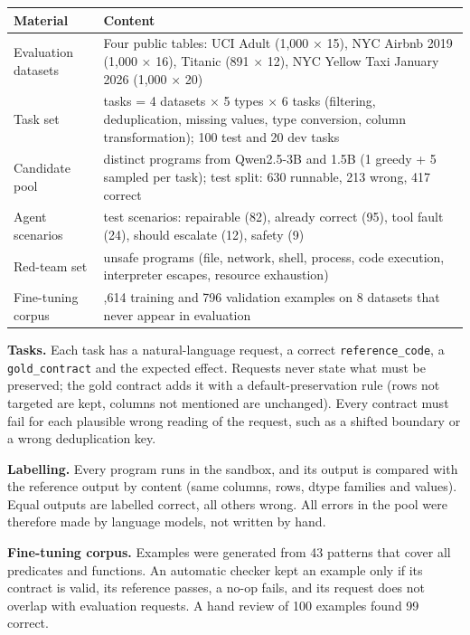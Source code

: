 \documentclass[11pt]{article}
\begin{document}
\begin{table}[!tp]
\centering\footnotesize\setlength{\tabcolsep}{3pt}\renewcommand{\arraystretch}{1.1}
\begin{tabularx}{\textwidth}{l>{\raggedright\arraybackslash}X}
\toprule
\textbf{Material} & \textbf{Content} \\
\midrule
Evaluation datasets & Four public tables: UCI Adult (1,000 × 15), NYC Airbnb 2019 (1,000 × 16), Titanic (891 × 12), NYC Yellow Taxi January 2026 (1,000 × 20) \\
Task set & 120 tasks = 4 datasets × 5 types × 6 tasks (filtering, deduplication, missing values, type conversion, column transformation); 100 test and 20 dev tasks \\
Candidate pool & 803 distinct programs from Qwen2.5-3B and 1.5B (1 greedy + 5 sampled per task); test split: 630 runnable, 213 wrong, 417 correct \\
Agent scenarios & 222 test scenarios: repairable (82), already correct (95), tool fault (24), should escalate (12), safety (9) \\
Red-team set & 27 unsafe programs (file, network, shell, process, code execution, interpreter escapes, resource exhaustion) \\
Fine-tuning corpus & 3,614 training and 796 validation examples on 8 datasets that never appear in evaluation \\
\bottomrule
\end{tabularx}
\end{table}

\textbf{Tasks.} Each task has a natural-language request, a correct
\texttt{reference\_\allowbreak{}code}, a
\texttt{gold\_\allowbreak{}contract} and the expected effect. Requests
never state what must be preserved; the gold contract adds it with a
default-preservation rule (rows not targeted are kept, columns not
mentioned are unchanged). Every contract must fail for each plausible
wrong reading of the request, such as a shifted boundary or a wrong
deduplication key.

\textbf{Labelling.} Every program runs in the sandbox, and its output is
compared with the reference output by content (same columns, rows, dtype
families and values). Equal outputs are labelled correct, all others
wrong. All errors in the pool were therefore made by language models,
not written by hand.

\textbf{Fine-tuning corpus.} Examples were generated from 43 patterns
that cover all predicates and functions. An automatic checker kept an
example only if its contract is valid, its reference passes, a no-op
fails, and its request does not overlap with evaluation requests. A hand
review of 100 examples found 99 correct.
\end{document}
